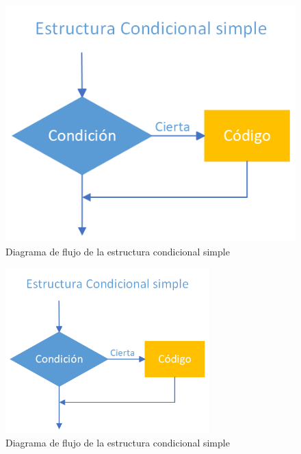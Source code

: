 \documentclass[
  a4paper,
]{scrreport}
\theoremstyle{definition}
\theoremstyle{definition}
\theoremstyle{remark}
\begin{document}
\begin{figure}

{\centering \includegraphics{img/04-estructuras-control/condicional-simple.png}

}

\caption{Diagrama de flujo de la estructura condicional simple}

\end{figure}

\begin{figure}

{\centering \includegraphics[width=0.7\textwidth,height=\textheight]{img/04-estructuras-control/condicional-simple.png}

}

\caption{Diagrama de flujo de la estructura condicional simple}

\end{figure}
\end{document}
